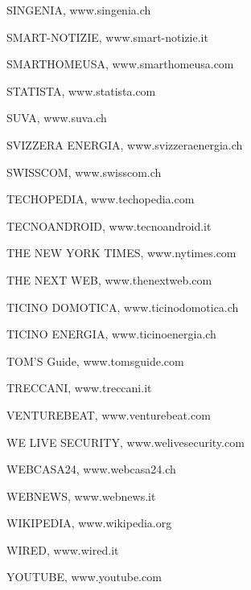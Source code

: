 \noindent SINGENIA, www.singenia.ch

\noindent SMART-NOTIZIE, www.smart-notizie.it 

\noindent SMARTHOMEUSA, www.smarthomeusa.com 

\noindent STATISTA, www.statista.com 

\noindent SUVA, www.suva.ch 

\noindent SVIZZERA ENERGIA, www.svizzeraenergia.ch

\noindent SWISSCOM, www.swisscom.ch 

\noindent TECHOPEDIA, www.techopedia.com 

\noindent TECNOANDROID, www.tecnoandroid.it 

\noindent THE NEW YORK TIMES, www.nytimes.com 

\noindent THE NEXT WEB, www.thenextweb.com 

\noindent TICINO DOMOTICA, www.ticinodomotica.ch

\noindent TICINO ENERGIA, www.ticinoenergia.ch

\noindent TOM'S Guide, www.tomsguide.com 


\noindent TRECCANI, www.treccani.it

\noindent VENTUREBEAT, www.venturebeat.com 

\noindent WE LIVE SECURITY, www.welivesecurity.com 

\noindent WEBCASA24, www.webcasa24.ch

\noindent WEBNEWS, www.webnews.it 

\noindent WIKIPEDIA, www.wikipedia.org 

\noindent WIRED, www.wired.it 

\noindent YOUTUBE, www.youtube.com
